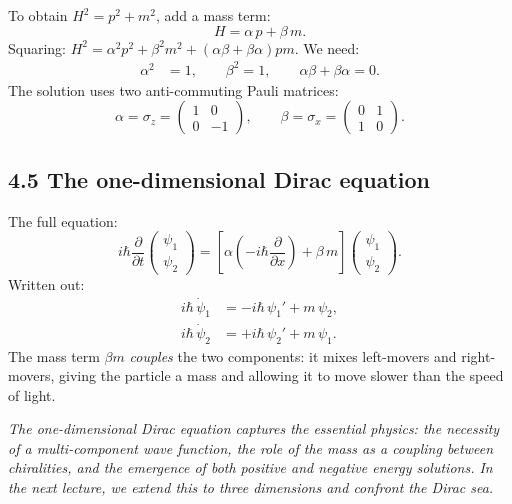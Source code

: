 \documentclass[12pt,a4paper]{article}
\begin{document}
To obtain $H^2 = p^2 + m^2$, add a mass term:
\[
    H = \alpha\, p + \beta\, m.
\]
Squaring: $H^2 = \alpha^2 p^2 + \beta^2 m^2 + (\alpha\beta + \beta\alpha)pm$.  We need:
\begin{align}
    \alpha^2 &= 1, \qquad \beta^2 = 1, \qquad \alpha\beta + \beta\alpha = 0.
\end{align}
The solution uses two anti-commuting Pauli matrices:
\[
    \alpha = \sigma_z = \begin{pmatrix} 1 & 0 \\ 0 & -1 \end{pmatrix}, \qquad
    \beta = \sigma_x = \begin{pmatrix} 0 & 1 \\ 1 & 0 \end{pmatrix}.
\]

\subsection{4.5 The one-dimensional Dirac equation}

The full equation:
\[
    i\hbar\frac{\partial}{\partial t}\begin{pmatrix}\psi_1 \\ \psi_2\end{pmatrix} = \left[\alpha\!\left(-i\hbar\frac{\partial}{\partial x}\right) + \beta\, m\right]\begin{pmatrix}\psi_1 \\ \psi_2\end{pmatrix}.
\]
Written out:
\begin{align}
    i\hbar\,\dot{\psi}_1 &= -i\hbar\,\psi_1' + m\,\psi_2, \\
    i\hbar\,\dot{\psi}_2 &= +i\hbar\,\psi_2' + m\,\psi_1.
\end{align}
The mass term $\beta m$ \emph{couples} the two components: it mixes left-movers and right-movers, giving the particle a mass and allowing it to move slower than the speed of light.

\medskip
\noindent\textit{The one-dimensional Dirac equation captures the essential physics: the necessity of a multi-component wave function, the role of the mass as a coupling between chiralities, and the emergence of both positive and negative energy solutions.  In the next lecture, we extend this to three dimensions and confront the Dirac sea.}
\end{document}
